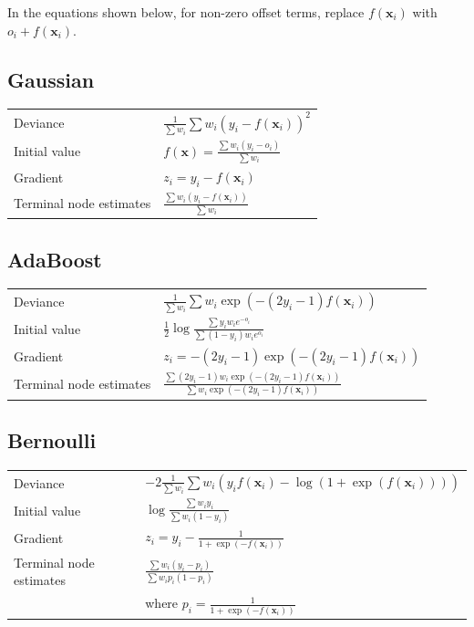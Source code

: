 \documentclass{article}
\begin{document}
In the equations shown below, for non-zero offset terms, replace
$f(\mathbf{x}_i)$ with $o_i + f(\mathbf{x}_i)$.

\subsection{Gaussian}

\begin{tabular}{ll} 
Deviance & $\displaystyle \frac{1}{\sum w_i} \sum w_i(y_i-f(\mathbf{x}_i))^2$ \\ 
Initial value & $\displaystyle f(\mathbf{x})=\frac{\sum w_i(y_i-o_i)}{\sum w_i}$ \\ 
Gradient & $z_i=y_i - f(\mathbf{x}_i)$ \\ 
Terminal node estimates & $\displaystyle \frac{\sum w_i(y_i-f(\mathbf{x}_i))}{\sum w_i}$ 
\end{tabular}

\subsection{AdaBoost}

\begin{tabular}{ll} Deviance & $\displaystyle \frac{1}{\sum w_i} \sum w_i\exp(-(2y_i-1)f(\mathbf{x}_i))$ \\ Initial value & $\displaystyle \frac{1}{2}\log\frac{\sum y_iw_ie^{-o_i}}{\sum (1-y_i)w_ie^{o_i}}$ \\ Gradient & $\displaystyle z_i= -(2y_i-1)\exp(-(2y_i-1)f(\mathbf{x}_i))$ \\ Terminal node estimates & $\displaystyle \frac{\sum (2y_i-1)w_i\exp(-(2y_i-1)f(\mathbf{x}_i))}
      {\sum w_i\exp(-(2y_i-1)f(\mathbf{x}_i))}$
\end{tabular}

\subsection{Bernoulli}

\begin{tabular}{ll} Deviance & $\displaystyle -2\frac{1}{\sum w_i} \sum w_i(y_if(\mathbf{x}_i)-\log(1+\exp(f(\mathbf{x}_i))))$ \\ Initial value & $\displaystyle \log\frac{\sum w_iy_i}{\sum w_i(1-y_i)}$ \\ Gradient & $\displaystyle z_i=y_i-\frac{1}{1+\exp(-f(\mathbf{x}_i))}$ \\ Terminal node estimates & $\displaystyle \frac{\sum w_i(y_i-p_i)}{\sum w_ip_i(1-p_i)}$ \\
  & where $\displaystyle p_i = \frac{1}{1+\exp(-f(\mathbf{x}_i))}$ \\
\end{tabular}
\end{document}
